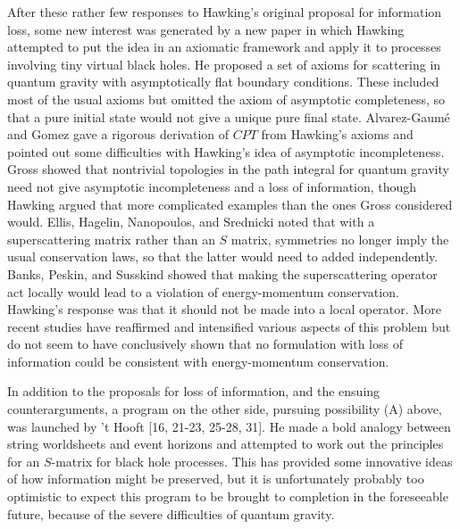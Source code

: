 \documentclass[12pt]{article}
\begin{document}
     After these rather few responses to Hawking's original proposal
for
information loss, some new interest was generated by a new paper
\cite{Haw82}
in which Hawking attempted to put the idea in an axiomatic framework
and apply
it to processes involving tiny virtual black holes.  He proposed a
set of
axioms for scattering in quantum gravity with asymptotically flat
boundary
conditions.  These included most of the usual axioms but omitted the
axiom of
asymptotic completeness, so that a pure initial state would not give
a unique
pure final state.  Alvarez-Gaum\'{e} and Gomez \cite{Alv83} gave a
rigorous
derivation of $CPT$ from Hawking's axioms and pointed out some
difficulties
with Hawking's idea of asymptotic incompleteness.  Gross \cite{Gro84}
showed
that nontrivial topologies in the path integral for quantum gravity
need not
give asymptotic incompleteness and a loss of information, though
Hawking
\cite{Haw84} argued that more complicated examples than the ones
Gross
considered would.  Ellis, Hagelin, Nanopoulos, and Srednicki
\cite{Ell84}
noted
that with a superscattering matrix rather than an $S$ matrix,
symmetries no
longer imply the usual conservation laws, so that the latter would
need to
added independently.  Banks, Peskin, and Susskind \cite{BPS} showed
that
making
the superscattering operator act locally would lead to a violation of
energy-momentum conservation.  Hawking's response \cite{Haw84} was
that it
should not be made into a local operator.  More recent studies
\cite{Sre,Liu}
have reaffirmed  and intensified various aspects of this problem but
do not
seem to have conclusively shown that no formulation with loss of
information
could be consistent with energy-momentum conservation.

     In addition to the proposals for loss of information, and the
ensuing
counterarguments, a program on the other side,
pursuing possibility (A) above, was launched by  't Hooft
[16, 21-23, 25-28, 31].
He made a bold analogy between string
worldsheets and event horizons and attempted to work out the
principles for an
$S$-matrix for black hole processes.  This has provided some
innovative ideas
of how information might be preserved, but it is unfortunately
probably too
optimistic to expect this program to be brought to completion in the
foreseeable future, because of the severe difficulties of quantum
gravity.
\end{document}
